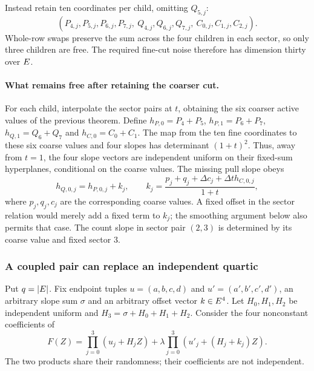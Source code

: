Instead retain ten coordinates per child, omitting $Q_{5,j}$:
\[
 (P_{4,j},P_{5,j},P_{6,j},P_{7,j},\ Q_{4,j},Q_{6,j},Q_{7,j},\ C_{0,j},C_{1,j},C_{2,j}).
\]
Whole-row swaps preserve the sum across the four children in each sector, so only three children are free. The required fine-cut noise therefore has dimension thirty over $E$.

\paragraph{What remains free after retaining the coarser cut.} For each child, interpolate the sector pairs at $t$, obtaining the six coarser active values of the previous theorem. Define $h_{P,0}=P_4+P_5$, $h_{P,1}=P_6+P_7$, $h_{Q,1}=Q_6+Q_7$ and $h_{C,0}=C_0+C_1$. The map from the ten fine coordinates to these six coarse values and four slopes has determinant $(1+t)^2$. Thus, away from $t=1$, the four slope vectors are independent uniform on their fixed-sum hyperplanes, conditional on the coarse values. The missing pull slope obeys
\[
 h_{Q,0,j}=h_{P,0,j}+k_j,\qquad
 k_j=\frac{p_j+q_j+\Delta c_j+\Delta t h_{C,0,j}}{1+t},
\]
where $p_j,q_j,c_j$ are the corresponding coarse values. A fixed offset in the sector relation would merely add a fixed term to $k_j$; the smoothing argument below also permits that case. The count slope in sector pair $(2,3)$ is determined by its coarse value and fixed sector $3$.

\subsubsection{A coupled pair can replace an independent quartic}

Put $q=|E|$. Fix endpoint tuples $u=(a,b,c,d)$ and $u'=(a',b',c',d')$, an arbitrary slope sum $\sigma$ and an arbitrary offset vector $k\in E^4$. Let $H_0,H_1,H_2$ be independent uniform and $H_3=\sigma+H_0+H_1+H_2$. Consider the four nonconstant coefficients of
\[
 F(Z)=\prod_{j=0}^3(u_j+H_jZ)
       +\lambda\prod_{j=0}^3(u'_j+(H_j+k_j)Z).
\]
The two products share their randomness; their coefficients are not independent.

